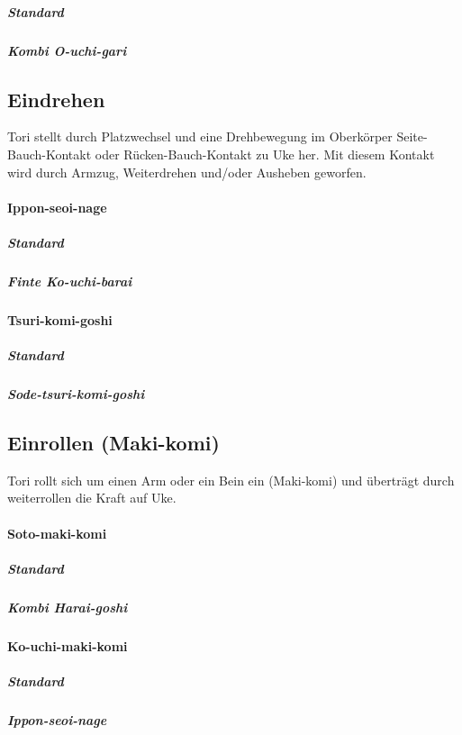 \documentclass[justified, a4paper, notitlepage, captions=tableheading, nobib]{tufte-handout}
\begin{document}
\subparagraph{Standard}
\label{sec:org5c7d8cd}

\subparagraph{Kombi O-uchi-gari}
\label{sec:org752f34c}

\subsection{Eindrehen }
\label{sec:orgd38ad45}

Tori stellt durch Platzwechsel und eine Drehbewegung im Oberkörper Seite-Bauch-Kontakt oder
Rücken-Bauch-Kontakt zu Uke her. Mit diesem Kontakt wird durch Armzug, Weiterdrehen und/oder
Ausheben geworfen.

\paragraph{Ippon-seoi-nage }
\label{sec:org16bae6f}

\subparagraph{Standard}
\label{sec:orgb03ad34}

\subparagraph{Finte Ko-uchi-barai}
\label{sec:org9714149}

\paragraph{Tsuri-komi-goshi }
\label{sec:org8a80287}

\subparagraph{Standard}
\label{sec:orgf738d45}

\subparagraph{Sode-tsuri-komi-goshi}
\label{sec:org04f5a6f}

\subsection{Einrollen (Maki-komi) }
\label{sec:orgc5e2447}

Tori rollt sich um einen Arm oder ein Bein ein (Maki-komi) und überträgt durch weiterrollen die Kraft
auf Uke.

\paragraph{Soto-maki-komi }
\label{sec:org8f6d5fc}
\subparagraph{Standard}
\label{sec:orgba5b539}
\subparagraph{Kombi Harai-goshi}
\label{sec:orge938f72}
\paragraph{Ko-uchi-maki-komi }
\label{sec:org0eb50d2}
\subparagraph{Standard}
\label{sec:org08c4424}

\subparagraph{Ippon-seoi-nage}
\label{sec:org18115d3}
\end{document}
